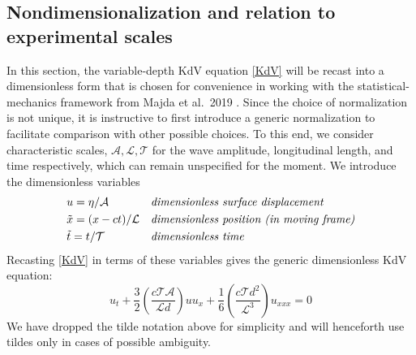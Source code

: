 \documentclass[11pt]{article}
\newcommand{\depth}{d}
\newcommand{\ampscale}{\mathcal{A}}
\newcommand{\lengthscale}{\mathcal{L}}
\newcommand{\timescale}{\mathcal{T}}
\begin{document}
 
\subsection{Nondimensionalization and relation to experimental scales}

In this section, the variable-depth KdV equation \eqref{KdV} will be recast into a dimensionless form that is chosen for convenience in working with the statistical-mechanics framework from Majda et al.~2019 \cite{majda2019}. Since the choice of normalization is not unique, it is instructive to first introduce a generic normalization to facilitate comparison with other possible choices. To this end, we consider characteristic scales, $\ampscale, \lengthscale, \timescale$ for the wave amplitude, longitudinal length, and time respectively, which can remain unspecified for the moment. We introduce the dimensionless variables
\begin{align}
&u = \eta / \ampscale
&&\mbox{\em dimensionless surface displacement} \\
&\tilde{x} = (x-ct) / \lengthscale
&&\mbox{\em dimensionless position (in moving frame)} \\
&\tilde{t} = t / \timescale
&&\mbox{\em dimensionless time}
\end{align}
Recasting \eqref{KdV} in terms of these variables gives the generic dimensionless KdV equation:
\begin{equation}
u_t + \frac{3}{2} \left( \frac{c \timescale \ampscale}{\lengthscale \depth} \right) u u_x 
+ \frac{1}{6} \left( \frac{c \timescale \depth^2}{\lengthscale^3} \right) u_{xxx} = 0
\end{equation}
We have dropped the tilde notation above for simplicity and will henceforth use tildes only in cases of possible ambiguity.
\end{document}
